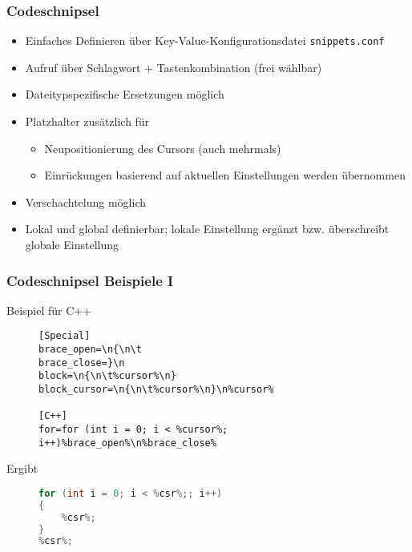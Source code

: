 \begin{frame}
	\frametitle{Codeschnipsel}
	\begin{block}{}
		\begin{itemize}
			\item Einfaches Definieren über Key-Value-Konfigurationsdatei
				  \texttt{snippets.conf}
			\item Aufruf über Schlagwort + Tastenkombination (frei wählbar)
			\item Dateitypspezifische Ersetzungen möglich
			\item Platzhalter zusätzlich für
				\begin{itemize}
					\item Neupositionierung des Cursors (auch mehrmals)
					\item Einrückungen basierend auf aktuellen Einstellungen
						  werden übernommen
				\end{itemize}
			\item Verschachtelung möglich
			\item Lokal und global definierbar; lokale Einstellung
				  ergänzt bzw. überschreibt globale Einstellung
		\end{itemize}
	\end{block}
\end{frame}

\begin{frame}[containsverbatim]
	\frametitle{Codeschnipsel Beispiele I}
	\begin{block}{Beispiel für C++}
		\begin{figure}[!h]
			\begin{lstlisting}[frame=none]
[Special]
brace_open=\n{\n\t
brace_close=}\n
block=\n{\n\t%cursor%\n}
block_cursor=\n{\n\t%cursor%\n}\n%cursor%

[C++]
for=for (int i = 0; i < %cursor%; i++)%brace_open%\n%brace_close%
			\end{lstlisting}
		\end{figure}
	\end{block}

	\begin{block}{Ergibt}
		\begin{figure}[!h]
			\begin{lstlisting}[frame=none, language=C++]
for (int i = 0; i < %csr%;; i++)
{
	%csr%;
}
%csr%;
			\end{lstlisting}
		\end{figure}
	\end{block}
\end{frame}
